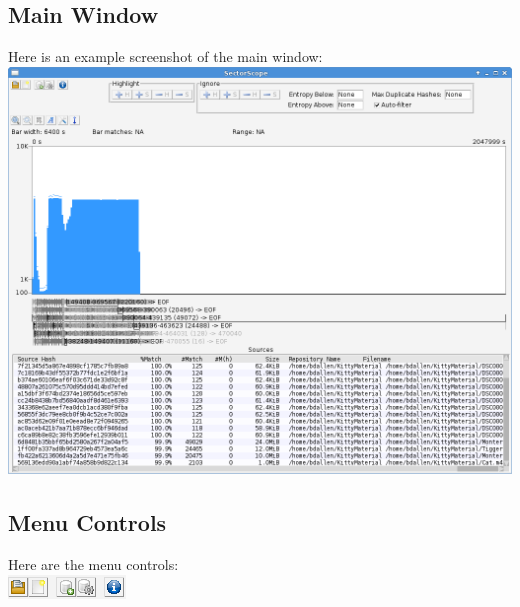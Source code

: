 \documentclass[11pt,fleqn]{article} %
\begin{document}
\subsection{Main Window}
Here is an example screenshot of the \sscope main window:\\
\includegraphics[scale=.4]{screenshots/main_window}\\

\subsection{Menu Controls}
Here are the menu controls:\\
\includegraphics[scale=.4]{screenshots/menu_controls}\\
\end{document}
